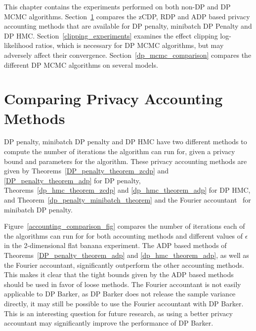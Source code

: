 \documentclass[english,twoside,openright]{HYgraduMLDS}
\begin{document}
This chapter contains the experiments performed on both non-DP and DP MCMC
algorithms. Section~\ref{accounting_comparison_section} compares the
zCDP, RDP and ADP based privacy accounting methods that are available
for DP penalty, minibatch DP Penalty and DP HMC.
Section~\ref{clipping_experiments}
examines the effect clipping log-likelihood ratios, which is necessary for
DP MCMC algorithms, but may adversely affect their convergence.
Section~\ref{dp_mcmc_comparison} compares the different DP MCMC algorithms
on several models.

\section{Comparing Privacy Accounting Methods}\label{accounting_comparison_section}

DP penalty, minibatch DP penalty and DP HMC have two different methods to
compute the number of iterations the algorithm can run for, given a privacy
bound and parameters for the algorithm. These privacy accounting methods
are given by Theorems~\ref{DP_penalty_theorem_zcdp} and
\ref{DP_penalty_theorem_adp} for DP penalty, Theorems~\ref{dp_hmc_theorem_zcdp}
and \ref{dp_hmc_theorem_adp} for DP HMC, and
Theorem~\ref{dp_penalty_minibatch_theorem} and the Fourier
accountant~\cite{KJH20} for minibatch DP penalty.

Figure~\ref{accounting_comparison_fig} compares the number of iterations
each of the algorithms can run for for both accounting methods and different
values of \(\epsilon\) in the 2-dimensional flat banana experiment.
The ADP based methods of Theorems~\ref{DP_penalty_theorem_adp}
and \ref{dp_hmc_theorem_adp}, as well as the Fourier accountant, significantly
outperform the other accounting methods. This makes it clear that the tight
bounds given by the ADP based methods should be used in favor of loose methods.
The Fourier accountant is not easily applicable to DP Barker, as DP Barker
does not release the sample variance directly, it may still be possible
to use the Fourier accountant with DP Barker. This is an interesting question
for future research, as using a better privacy accountant may significantly
improve the performance of DP Barker.
\end{document}
